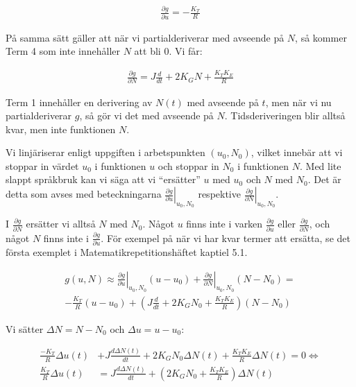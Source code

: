 \documentclass[a4paper]{article}
\begin{document}
\begin{align*}
  \frac{\partial g}{\partial u} = -\frac{K_T}{R}
\end{align*}

På samma sätt gäller att när vi partialderiverar med avseende på $N$, så kommer Term 4 som inte innehåller $N$ att bli 0. Vi får:

\begin{align*}
  \frac{\partial g}{\partial N} = J\frac{d}{dt} + 2K_G N + \frac{K_T K_E}{R}
\end{align*}

Term 1 innehåller en derivering av $N(t)$ med avseende på $t$, men när vi nu partialderiverar $g$, så gör vi det med avseende på $N$. Tidsderiveringen blir alltså kvar, men inte funktionen $N$.

Vi linjäriserar enligt uppgiften i arbetspunkten $(u_0, N_0)$, vilket innebär att vi stoppar in värdet $u_0$ i funktionen $u$ och stoppar in $N_0$ i funktionen $N$. Med lite slappt språkbruk kan vi säga att vi ``ersätter'' $u$ med $u_0$ och $N$ med $N_0$. Det är detta som avses med beteckningarna $\left. \frac{\partial g}{\partial u} \right|_{u_0, N_0}$ respektive $\left. \frac{\partial g}{\partial N} \right|_{u_0, N_0}$.

I $\frac{\partial g}{\partial N}$ ersätter vi alltså $N$ med $N_0$. Något $u$ finns inte i varken $\frac{\partial g}{\partial u}$ eller $\frac{\partial g}{\partial N}$, och något $N$ finns inte i $\frac{\partial g}{\partial u}$. För exempel på när vi har kvar termer att ersätta, se det första exemplet i Matematikrepetitionshäftet kaptiel 5.1.

\begin{align*}
  g(u, N) \approx \left. \frac{\partial g}{\partial u}\right|_{u_0, N_0}(u - u_0) + \left. \frac{\partial g}{\partial N}\right|_{u_0, N_0}(N - N_0) = \\
  -\frac{K_T}{R}(u - u_0) + \left(J\frac{d}{dt} + 2K_G N_0 + \frac{K_T K_E}{R} \right)(N - N_0)
\end{align*}

Vi sätter $\Delta N = N - N_0$ och $\Delta u = u - u_0$:

\begin{align*}
  \frac{-K_T}{R}\Delta u(t) &+ J\frac{d\Delta N(t)}{dt} + 2K_G N_0\Delta N(t) + \frac{K_T K_E}{R} \Delta N(t) = 0 \Longleftrightarrow\\
  \frac{K_T}{R}\Delta u(t) &= J\frac{d\Delta N(t)}{dt} + \left(2K_G N_0 + \frac{K_T K_E}{R} \right) \Delta N(t)
\end{align*}
\end{document}
